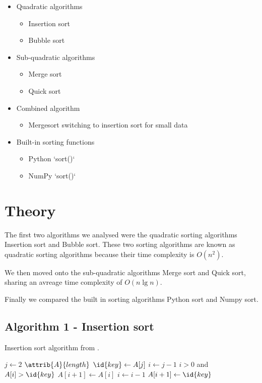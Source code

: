 \documentclass[sigconf, nonacm, natbib, screen, balance=False]{acmart}
\begin{document}
\begin{itemize}

\item Quadratic algorithms
  \begin{itemize}
  \item Insertion sort
  \item Bubble sort
  \end{itemize}
\item Sub-quadratic algorithms
  \begin{itemize}
  \item Merge sort
  \item Quick sort
  \end{itemize}
\item Combined algorithm
  \begin{itemize}
  \item Mergesort switching to insertion sort for small data
  \end{itemize}
\item Built-in sorting functions
  \begin{itemize}
  \item Python `sort()`
  \item NumPy `sort()`
  \end{itemize}
\end{itemize}

\section{Theory}\label{sec:theory}

The first two algorithms we analysed were the quadratic sorting algorithms Insertion sort and Bubble sort. These two sorting algorithms are known as quadratic sorting algorithms because their time complexity is $O(n^2)$.
 
We then moved onto the sub-quadratic algorithms Merge sort and Quick sort, sharing an avreage time complexity of $O(n\lg n)$. 

Finally we compared the built in sorting algorithms Python sort and Numpy sort. 

\subsection{Algorithm 1 - Insertion sort}\label{sec:algo1}

\begin{listing}
  \caption{Insertion sort algorithm from \citet[Ch.~2.1]{CLRS_2009}.}
  \label{lst:insertion_algo}

  \begin{codebox}
    \li \For $j \gets 2$ \To $\attrib{A}{length}$
    \li \Do
    $\id{key} \gets A[j]$
    \li     $i \gets j-1$
    \li      \While $i>0$ and $A[i] > \id{key}$
    \li      \Do
    $A[i+1] \gets A[i]$
    \li         $i \gets i-1$
    \End    
    \li       $A[i+1]\gets \id{key}$
    \End
  \end{codebox}
\end{listing}
\end{document}
